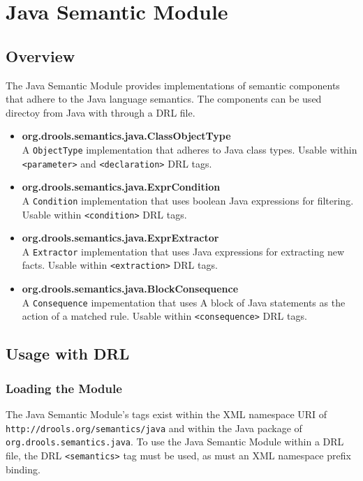 \chapter{Java Semantic Module}

\section{Overview}

The Java Semantic Module provides implementations of semantic
components that adhere to the Java language semantics.  The components
can be used directoy from Java with through a DRL file.


\begin{itemize}
	\item \textbf{\textsf{org.drools.semantics.java.ClassObjectType}}\\
		A \verb|ObjectType| implementation that adheres
		to Java class types.  Usable within \verb|<parameter>|
		and \verb|<declaration>| DRL tags.
	\item \textbf{\textsf{org.drools.semantics.java.ExprCondition}}\\
		A \verb|Condition| implementation that uses boolean
		Java expressions for filtering. Usable within 
		\verb|<condition>| DRL tags.
	\item \textbf{\textsf{org.drools.semantics.java.ExprExtractor}}\\
		A \verb|Extractor| implementation that uses Java
		expressions for extracting new facts.  Usable
		within \verb|<extraction>| DRL tags.
	\item \textbf{\textsf{org.drools.semantics.java.BlockConsequence}}\\
		A \verb|Consequence| impementation that uses
		A block of Java statements as the action of a
		matched rule.  Usable within \verb|<consequence>|
		DRL tags.
\end{itemize}

\clearpage

\section{Usage with DRL}

\subsection{Loading the Module}

The Java Semantic Module's tags exist within the XML namespace
URI of \verb|http://drools.org/semantics/java| and within the
Java package of\\ \verb|org.drools.semantics.java|.  To use the
Java Semantic Module within a DRL file, the DRL \verb|<semantics>|
tag must be used, as must an XML namespace prefix binding.

